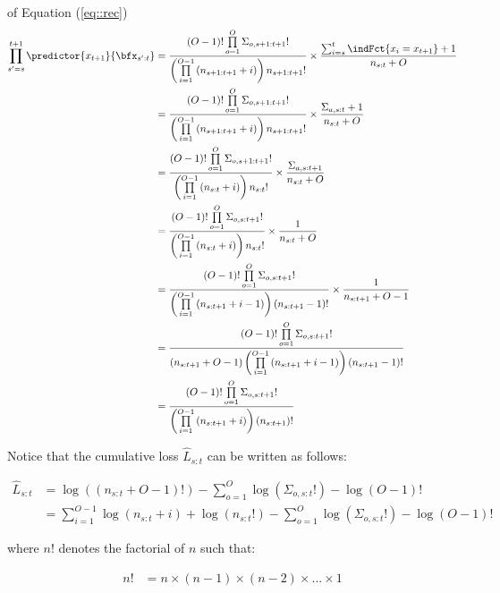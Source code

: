 \documentclass{article} %
\begin{document}
\begin{myproof}{of Equation (\ref{eq::rec})}
\begin{align*}
    \prod_{s'=s}^{t+1}  \predictor{x_{t+1}}{\bfx_{s':t}} &= \frac{ (O-1)!
  \prod\limits_{o=1}^{O}  \Sigma_{o,s+1:t+1}! }{ \left(\prod\limits_{i=1}^{O-1} \left( n_{s+1:t+1}+i \right) \right)  n_{s+1:t+1}!} \times \frac{\sum_{i=s}^{t} \indFct{x_i = x_{t+1}}   + 1 }{n_{s:t} + O } \\
  &= \frac{ (O-1)!
  \prod\limits_{o=1}^{O}  \Sigma_{o,s+1:t+1}! }{ \left(\prod\limits_{i=1}^{O-1} \left( n_{s+1:t+1}+i \right) \right)  n_{s+1:t+1}!} \times \frac{\Sigma_{a,s:t}   + 1 }{n_{s:t} + O } \\ 
  &= \frac{ (O-1)!
  \prod\limits_{o=1}^{O}  \Sigma_{o,s+1:t+1}! }{ \left(\prod\limits_{i=1}^{O-1} \left( n_{s:t}+i \right) \right)  n_{s:t}!} \times \frac{\Sigma_{a,s:t+1}  }{n_{s:t} + O } \\
  &=  \frac{ (O-1)!
  \prod\limits_{o=1}^{O}  \Sigma_{o,s:t+1}! }{ \left(\prod\limits_{i=1}^{O-1} \left( n_{s:t}+i \right) \right)  n_{s:t}!} \times \frac{1  }{n_{s:t} + O } \\
  &=  \frac{ (O-1)!
  \prod\limits_{o=1}^{O}  \Sigma_{o,s:t+1}! }{ \left(\prod\limits_{i=1}^{O-1} \left( n_{s:t+1}+i-1 \right) \right) \left( n_{s:t+1} -1 \right) !} \times \frac{1  }{n_{s:t+1} + O -1 } \\
  &=  \frac{ (O-1)!
  \prod\limits_{o=1}^{O}  \Sigma_{o,s:t+1}! }{ \left(n_{s:t+1} + O -1 \right)  \left(\prod\limits_{i=1}^{O-1} \left( n_{s:t+1}+i-1 \right) \right) \left( n_{s:t+1} -1 \right) !} \\
  &=  \frac{ (O-1)!
  \prod\limits_{o=1}^{O}  \Sigma_{o,s:t+1}! }{   \left(\prod\limits_{i=1}^{O-1} \left( n_{s:t+1}+i \right) \right) \left( n_{s:t+1}\right) !}
\end{align*}
\end{myproof}

Notice that the cumulative loss $\hat{L}_{s:t}$ can be written as follows:


\begin{align*}
	\hat{L}_{s:t} &= \log \left( \left(n_{s:t}+O-1 \right)! \right) - \sum_{o=1}^{O} \log \left( \Sigma_{o,s:t}! \right) - \log (O-1)! \\
        &= \sum_{i=1}^{O-1} \log \left( n_{s:t}+i  \right) + \log \left( n_{s:t}! \right) - \sum_{o=1}^{O} \log \left( \Sigma_{o,s:t}! \right) - \log (O-1)!
	\end{align*}


where $n!$ denotes the factorial of $n$ such that:

\begin{align*}
    n! &= n\times (n-1)\times (n-2)\times ... \times 1
\end{align*}
\end{document}
